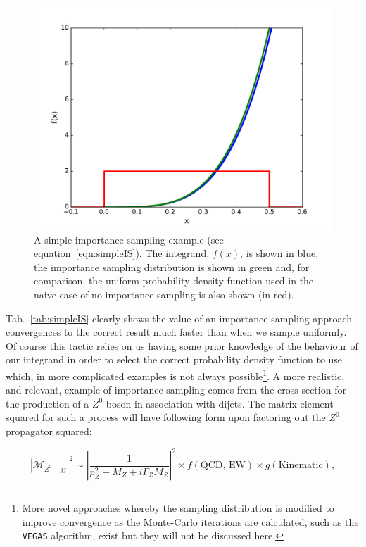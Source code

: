 	\begin{figure}[htp]
		\includegraphics[width=\textwidth]{importanceSampling}
		\caption{A simple importance sampling example (see equation~\ref{eqn:simpleIS}).  The integrand, $f(x)$, is shown in blue,
		the importance sampling distribution is shown in green and, for comparison, the uniform probability density function used
		in the naive case of no importance sampling is also shown (in red).}
		\label{fig:simpleIS}
  	\end{figure}

  	Tab.~\ref{tab:simpleIS} clearly shows the value of an importance sampling approach convergences to the correct result
  	much faster than when we sample uniformly. Of course this tactic relies on us having some prior knowledge of the behaviour of our
  	integrand in order to select the correct probability density function to use which, in more complicated examples is not always
  	possible\footnote{More novel approaches whereby the sampling distribution is modified to improve convergence as the Monte-Carlo
  	iterations are calculated, such as the \texttt{VEGAS} algorithm,
  	exist but they will not be discussed here.}. A more realistic, and relevant, example of importance sampling comes from the
  	cross-section for the production of a $Z^0$ boson in association with dijets.  The matrix element squared for such a process
  	will have following form upon factoring out the $Z^0$ propagator squared:

  	\begin{equation}
  		|\mathcal{M}_{Z^0+jj}|^2 \sim \left|\frac{1}{p_Z^2 - M_Z + i\Gamma_ZM_Z}\right|^2\times f(\text{QCD, EW})\times g(\text{Kinematic}),
  		\label{eqn:schematicZ}
  	\end{equation}

